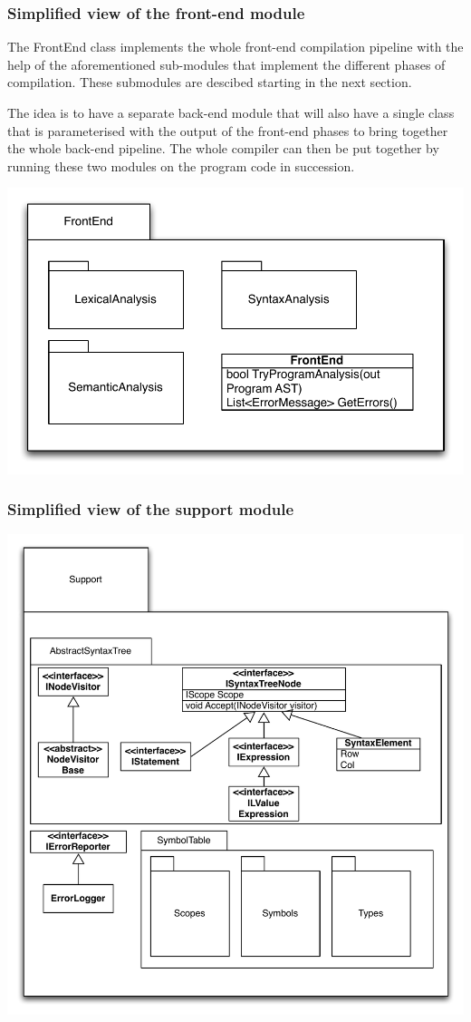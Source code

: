 \documentclass[a4paper,11pt]{article}
\begin{document}
\subsubsection{Simplified view of the front-end module}

The FrontEnd class implements the whole front-end compilation pipeline with the help of the aforementioned sub-modules that implement the different phases of compilation. These submodules are descibed starting in the next section.

The idea is to have a separate back-end module that will also have a single class that is parameterised with the output of the front-end phases to bring together the whole back-end pipeline. The whole compiler can then be put together by running these two modules on the program code in succession.

\includegraphics[width=1.0\textwidth]{frontend.pdf}

\subsubsection{Simplified view of the support module}

\includegraphics[width=1.0\textwidth]{support.pdf}
\end{document}
